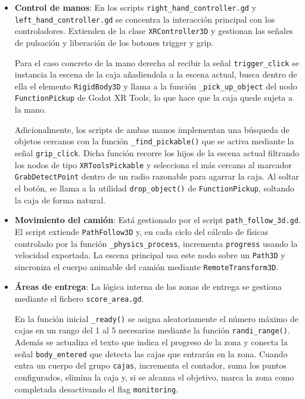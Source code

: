 \documentclass[12pt, a4paper]{article}
\begin{document}
\begin{itemize}[leftmargin=*]

    \item \textbf{Control de manos}: En los scripts \texttt{right\_hand\_controller.gd} y \texttt{left\_hand\_controller.gd} se concentra la interacción principal con los controladores. Extienden de la clase \texttt{XRController3D} y gestionan las señales de pulsación y liberación de los botones trigger y grip. 
    
    Para el caso concreto de la mano derecha al recibir la señal \texttt{trigger\_click} se instancia la escena de la caja añadiendola a la escena actual, busca dentro de ella el elemento \texttt{RigidBody3D} y llama a la función \texttt{\_pick\_up\_object} del nodo \texttt{FunctionPickup} de Godot XR Tools, lo que hace que la caja quede sujeta a la mano.

    Adicionalmente, los scripts de ambas manos implementan una búsqueda de objetos cercanos con la función \texttt{\_find\_pickable()} que se activa mediante la señal \texttt{grip\_click}. Dicha función recorre los hijos de la escena actual filtrando los nodos de tipo \texttt{XRToolsPickable} y selecciona el más cercano al marcador \texttt{GrabDetectPoint} dentro de un radio razonable para agarrar la caja. Al soltar el botón, se llama a la utilidad \texttt{drop\_object()} de \texttt{FunctionPickup}, soltando la caja de forma natural.

     \item \textbf{Movimiento del camión}: Está gestionado por el script \texttt{path\_follow\_3d.gd}. El script extiende \texttt{PathFollow3D} y, en cada ciclo del cálculo de físicas controlado por la función \texttt{\_physics\_process}, incrementa \texttt{progress} usando la velocidad exportada. La escena principal usa este nodo sobre un \texttt{Path3D} y sincroniza el cuerpo animable del camión mediante \texttt{RemoteTransform3D}.

    \item \textbf{Áreas de entrega}: La lógica interna de las zonas de entrega se gestiona mediante el fichero \texttt{score\_area.gd}.
    
    En la función inicial \texttt{\_ready()} se asigna aleatoriamente el número máximo de cajas en un rango del 1 al 5 necesarias mediante la función \texttt{randi\_range()}. Además se actualiza el texto que indica el progreso de la zona y conecta la señal \texttt{body\_entered} que detecta las cajas que entrarán en la zona. Cuando entra un cuerpo del grupo \texttt{cajas}, incrementa el contador, suma los puntos configurados, elimina la caja y, si se alcanza el objetivo, marca la zona como completada desactivando el flag \texttt{monitoring}.


\end{itemize}
\end{document}

